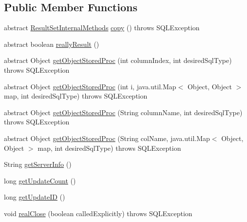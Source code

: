 \subsection*{Public Member Functions}
\begin{DoxyCompactItemize}
\item 
abstract \mbox{\hyperlink{interfacecom_1_1mysql_1_1jdbc_1_1_result_set_internal_methods}{Result\+Set\+Internal\+Methods}} \mbox{\hyperlink{interfacecom_1_1mysql_1_1jdbc_1_1_result_set_internal_methods_aa9fcef476bda66d0c230ef68931a44cf}{copy}} ()  throws S\+Q\+L\+Exception
\item 
abstract boolean \mbox{\hyperlink{interfacecom_1_1mysql_1_1jdbc_1_1_result_set_internal_methods_a3e6296e287a3c596e1d63ca2d8fe9fc5}{really\+Result}} ()
\item 
abstract Object \mbox{\hyperlink{interfacecom_1_1mysql_1_1jdbc_1_1_result_set_internal_methods_a817a3b9788bab58dde079d89c4c0d1d9}{get\+Object\+Stored\+Proc}} (int column\+Index, int desired\+Sql\+Type)  throws S\+Q\+L\+Exception
\item 
abstract Object \mbox{\hyperlink{interfacecom_1_1mysql_1_1jdbc_1_1_result_set_internal_methods_accf48b92de260b6e92cf8bdd0ec49a29}{get\+Object\+Stored\+Proc}} (int i, java.\+util.\+Map$<$ Object, Object $>$ map, int desired\+Sql\+Type)  throws S\+Q\+L\+Exception
\item 
abstract Object \mbox{\hyperlink{interfacecom_1_1mysql_1_1jdbc_1_1_result_set_internal_methods_aa693d4e906617c6ef3be279b1416748b}{get\+Object\+Stored\+Proc}} (String column\+Name, int desired\+Sql\+Type)  throws S\+Q\+L\+Exception
\item 
abstract Object \mbox{\hyperlink{interfacecom_1_1mysql_1_1jdbc_1_1_result_set_internal_methods_ac4bc017d69d3768d7000126d47a77866}{get\+Object\+Stored\+Proc}} (String col\+Name, java.\+util.\+Map$<$ Object, Object $>$ map, int desired\+Sql\+Type)  throws S\+Q\+L\+Exception
\item 
String \mbox{\hyperlink{interfacecom_1_1mysql_1_1jdbc_1_1_result_set_internal_methods_add46fbb3bd5ecdfe2fa1fa77b3816425}{get\+Server\+Info}} ()
\item 
long \mbox{\hyperlink{interfacecom_1_1mysql_1_1jdbc_1_1_result_set_internal_methods_ae143240bc7e0d1553f6fec904bbf0170}{get\+Update\+Count}} ()
\item 
long \mbox{\hyperlink{interfacecom_1_1mysql_1_1jdbc_1_1_result_set_internal_methods_ae53e8a9c6f65d29a46883ba31b41ace2}{get\+Update\+ID}} ()
\item 
void \mbox{\hyperlink{interfacecom_1_1mysql_1_1jdbc_1_1_result_set_internal_methods_a04e640b79d91cb9a0eefecf583740187}{real\+Close}} (boolean called\+Explicitly)  throws S\+Q\+L\+Exception

\end{DoxyCompactItemize}
